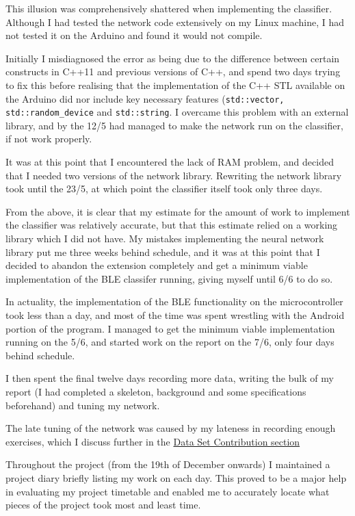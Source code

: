 \documentclass[a4paper]{article}
\begin{document}
This illusion was comprehensively shattered when implementing the classifier. Although I had tested the network code extensively on my Linux machine, I had not tested it on the Arduino and found it would not compile.

Initially I misdiagnosed the error as being due to the difference between certain constructs in C++11 and previous versions of C++, and spend two days trying to fix this before realising that the implementation of the C++ STL available on the Arduino did nor include key necessary features (\lstinline{std::vector, std::random_device} and \lstinline{std::string}. I overcame this problem with an external library, and by the 12/5 had managed to make the network run on the classifier, if not work properly.

It was at this point that I encountered the lack of RAM problem, and decided that I needed two versions of the network library. Rewriting the network library took until the 23/5, at which point the classifier itself took only three days. 

From the above, it is clear that my estimate for the amount of work to implement the classifier was relatively accurate, but that this estimate relied on a working library which I did not have. My mistakes implementing the neural network library put me three weeks behind schedule, and it was at this point that I decided to abandon the extension completely and get a minimum viable implementation of the BLE classifer running, giving myself until 6/6 to do so.

In actuality, the implementation of the BLE functionality on the microcontroller took less than a day, and most of the time was spent wrestling with the Android portion of the program. I managed to get the minimum viable implementation running on the 5/6, and started work on the report on the 7/6, only four days behind schedule.

I then spent the final twelve days recording more data, writing the bulk of my report (I had completed a skeleton, background and some specifications beforehand) and tuning my network.

The late tuning of the network was caused by my lateness in recording enough exercises, which I discuss further in the \hyperref[subsec:ev_ds]{Data Set Contribution section}

Throughout the project (from the 19th of December onwards) I maintained a project diary briefly listing my work on each day. This proved to be a major help in evaluating my project timetable and enabled me to accurately locate what pieces of the project took most and least time.
\end{document}

